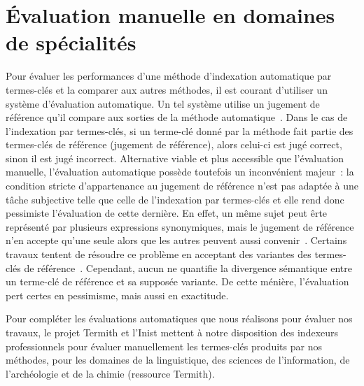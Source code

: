 
  \section{Évaluation manuelle en domaines de spécialités}
  \label{sec:main-domain_specific_keyphrase_annotation-manual_evaluation}
    Pour évaluer les performances d'une méthode d'indexation automatique par
    termes-clés et la comparer aux autres méthodes, il est courant d'utiliser un
    système d'évaluation automatique. Un tel système utilise un jugement de
    référence qu'il compare aux sorties de la méthode
    automatique~\cite{voorhees2002philosophy}. Dans le cas de l'indexation par
    termes-clés, si un terme-clé donné par la méthode fait partie des
    termes-clés de référence (jugement de référence), alors celui-ci est jugé
    correct, sinon il est jugé incorrect. Alternative viable et plus accessible
    que l'évaluation manuelle, l'évaluation automatique possède toutefois un
    inconvénient majeur~: la condition stricte d'appartenance au jugement de
    référence n'est pas adaptée à une tâche subjective telle que celle de
    l'indexation par termes-clés et elle rend donc pessimiste l'évaluation de
    cette dernière. En effet, un même sujet peut êrte représenté par plusieurs
    expressions synonymiques, mais le jugement de référence n'en accepte qu'une
    seule alors que les autres peuvent aussi
    convenir~\cite{hasan2014state_of_the_art}. Certains travaux tentent de
    résoudre ce problème en acceptant des variantes des termes-clés de
    référence~\cite{zesch2009rprecision,kim2010rprecision}. Cependant, aucun ne
    quantifie la divergence sémantique entre un terme-clé de référence et sa
    supposée variante. De cette ménière, l'évaluation pert certes en pessimisme,
    mais aussi en exactitude.
    
    Pour compléter les évaluations automatiques que nous réalisons pour évaluer
    nos travaux, le projet Termith et l'Inist mettent à notre disposition des
    indexeurs professionnels pour évaluer manuellement les termes-clés produits
    par nos méthodes, pour les domaines de la linguistique, des sciences de
    l'information, de l'archéologie et de la chimie (ressource Termith).

